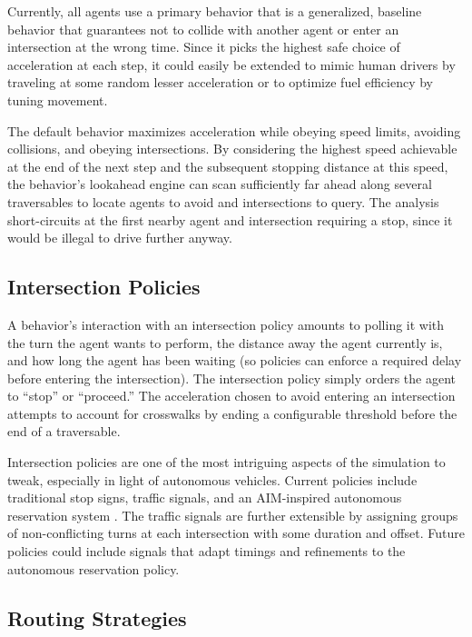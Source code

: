 \documentclass[letterpaper, 10 pt, conference]{ieeeconf}  %
\begin{document}
Currently, all agents use a primary behavior that is a generalized, baseline
behavior that guarantees not to collide with another agent or enter an
intersection at the wrong time. Since it picks the highest safe choice of
acceleration at each step, it could easily be extended to mimic human drivers by
traveling at some random lesser acceleration or to optimize fuel efficiency
by tuning movement.

The default behavior maximizes acceleration while obeying speed limits,
avoiding collisions, and obeying intersections. By considering the highest speed
achievable at the end of the next step and the subsequent stopping distance at
this speed, the behavior's lookahead engine can scan sufficiently far ahead
along several traversables to locate agents to avoid and intersections to query.
The analysis short-circuits at the first nearby agent and intersection requiring
a stop, since it would be illegal to drive further anyway.

\subsection{Intersection Policies}

A behavior's interaction with an intersection policy amounts to polling it with
the turn the agent wants to perform, the distance away the agent currently is,
and how long the agent has been waiting (so policies can enforce a required
delay before entering the intersection). The intersection policy simply orders
the agent to ``stop'' or ``proceed.'' The acceleration chosen to avoid entering
an intersection attempts to account for crosswalks by ending a configurable
threshold before the end of a traversable.

Intersection policies are one of the most intriguing aspects of the simulation
to tweak, especially in light of autonomous vehicles. Current policies include
traditional stop signs, traffic signals, and an AIM-inspired autonomous
reservation system \cite{JAIR08-dresner}. The traffic signals are further
extensible by assigning groups of non-conflicting turns at each intersection
with some duration and offset. Future policies could include signals that adapt
timings and refinements to the autonomous reservation policy.

\subsection{Routing Strategies}
\end{document}
